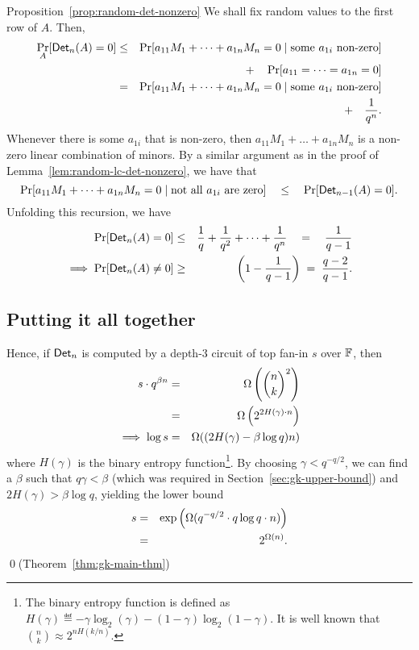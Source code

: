 \begin{proofof}{Proposition~\ref{prop:random-det-nonzero}}
We shall fix random values to the first row of $A$. Then,
\begin{eqnarray*}
\Pr_{A}[\mathsf{Det}_n(A) = 0] & \leq & \Pr[a_{11} M_1 + \dots + a_{1n} M_n = 0 \;|\;\text{some $a_{1i}$ non-zero}]\\
& &\quad + \quad \Pr[a_{11}=\dots = a_{1n} = 0]\\
 & = & \Pr[a_{11} M_1 + \dots + a_{1n} M_n = 0 \;|\;\text{some $a_{1i}$ non-zero}]\\
 & & \quad + \quad \frac{1}{q^n}.
\end{eqnarray*}
Whenever there is some $a_{1i}$ that is non-zero, then $a_{11}M_1 +
\dots + a_{1n}M_n$ is a non-zero linear combination of minors. By a similar argument as in the proof of Lemma~\ref{lem:random-lc-det-nonzero}, we have that
$$
\Pr[a_{11} M_1 + \dots + a_{1n}M_n = 0\;|\;\text{not all $a_{1i}$ are zero}] \quad \leq \quad \Pr[\mathsf{Det}_{n-1}(A) = 0].
$$
Unfolding this recursion, we have
\begin{eqnarray*}
\Pr[\mathsf{Det}_n(A) = 0] & \leq & \frac{1}{q} + \frac{1}{q^2} + \dots + \frac{1}{q^n} \quad=\quad \frac{1}{q-1}\\
\implies \Pr[\mathsf{Det}_n(A) \neq 0] & \geq & \left(1 - \frac{1}{q-1}\right) \;=\; \frac{q-2}{q-1}.
\end{eqnarray*}
\end{proofof}



\subsection{Putting it all together}

Hence, if $\mathsf{Det}_n$ is computed by a depth-3 circuit of top fan-in $s$ over $\mathbb{F}$, then 
\begin{eqnarray*}
s \cdot q^{\beta n} & = &  \Omega\left(\binom{n}{k}^2\right)\\
 & = & \Omega\left(2^{2H(\gamma)\cdot n}\right)\\
\implies \log s & = & \Omega((2H(\gamma) - \beta \log q)n)
\end{eqnarray*}
where $H(\gamma)$ is the binary entropy function\footnote{The binary entropy function is defined as $H(\gamma) \eqdef -\gamma \log_2(\gamma) - (1-\gamma)\log_2(1-\gamma)$. It is well known that $\binom{n}{k} \approx 2^{nH(k/n)}$. }. 
By choosing $\gamma < q^{-q/2}$, we can find a $\beta$ such that
$q\gamma < \beta$ (which was required in
Section~\ref{sec:gk-upper-bound}) and $2H(\gamma) > \beta \log q$,
yielding the lower bound  
\begin{eqnarray*}
  s &=& \exp\left(\Omega(q^{-q/2}\cdot q\log q \cdot n)\right) \\
  & =& 2^{\Omega(n)}.
\end{eqnarray*}
\qed (Theorem~\ref{thm:gk-main-thm})


